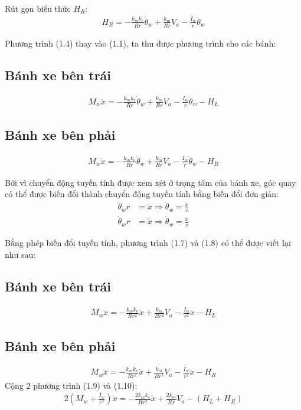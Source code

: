        Rút gọn biểu thức $H_R$:
        \begin{align}
            H_R = -\frac{k_m k_e}{Rr} \dot{\theta}_w  + \frac{k_m}{Rr} V_a - \frac{I_w}{r} \ddot{\theta}_w 
        \end{align}
        
        Phương trình (1.4) thay vào (1.1), ta thu được phương trình cho các bánh:
        
        \subsection*{Bánh xe bên trái}
            \begin{align}
                M_w \ddot{x} = -\frac{k_m k_e}{Rr} \dot{\theta}_w + \frac{k_m}{Rr} V_a - \frac{I_{w}}{r} \ddot{\theta}_w - H_L 
            \end{align}
        
        \subsection*{Bánh xe bên phải}
            \begin{align}
                M_w \ddot{x} = -\frac{k_m k_e}{Rr} \dot{\theta}_w  + \frac{k_m}{Rr} V_a - \frac{I_{w}}{r} \ddot{\theta}_w - H_R 
            \end{align}
        
        Bởi vì chuyển động tuyến tính được xem xét ở trọng tâm của bánh xe, góc quay có thể được biến đổi thành chuyển động tuyến tính bằng biến đổi đơn giản:
        \begin{align*}
            \ddot{\theta}_w r &= \ddot{x} \Rightarrow \ddot{\theta}_w = \frac{\ddot{x}}{r} \\
            \dot{\theta}_w r &= \dot{x} \Rightarrow \dot{\theta}_w = \frac{\dot{x}}{r}
        \end{align*}
       
        Bằng phép biến đổi tuyến tính, phương trình (1.7) và (1.8) có thể được viết lại như sau:
        \subsection*{Bánh xe bên trái}
        \begin{align}
            M_w \ddot{x} = -\frac{k_m k_e}{Rr^2} \dot{x} + \frac{k_m}{Rr^2} V_a - \frac{I_{w}}{r^2} \ddot{x} - H_L 
        \end{align}
        \subsection*{Bánh xe bên phải}
        \begin{align}
            M_w \ddot{x} = -\frac{k_m k_e}{Rr^2} \dot{x} + \frac{k_m}{Rr^2} V_a - \frac{I_{w}}{r^2} \ddot{x} - H_R 
        \end{align}
        \hspace*{0.6cm}Cộng 2 phương trình (1.9) và (1.10):
        \begin{align}
            2(M_w + \frac{I_w}{r^2})\ddot{x} = -\frac{2k_m k_e}{Rr^2} \dot{x} + \frac{2k_m}{Rr} V_a  - (H_L + H_R)
        \end{align}
